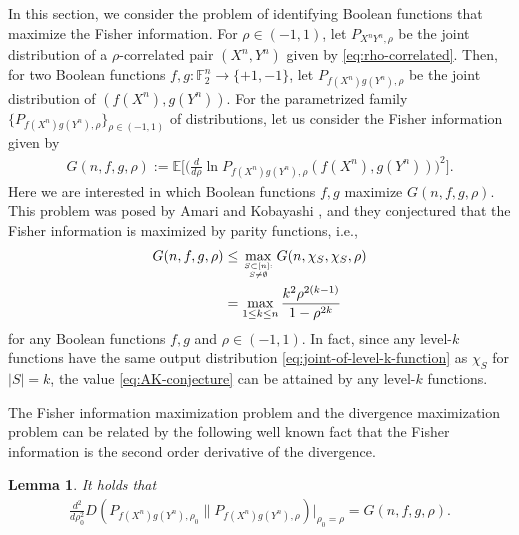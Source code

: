 \documentclass[journal,draftcls, onecolumn]{IEEEtran}
\newtheorem{lemma}{Lemma}
\begin{document}
In this section, we consider the problem of identifying Boolean functions that maximize the Fisher information.
For $\rho \in (-1,1)$, let $P_{X^nY^n,\rho}$ be the joint distribution of a $\rho$-correlated pair
$(X^n,Y^n)$ given by \eqref{eq:rho-correlated}. Then, for two Boolean functions
$f,g:\mathbb{F}_2^n \to \{+1,-1\}$, let $P_{f(X^n)g(Y^n),\rho}$ be the joint distribution of 
$(f(X^n),g(Y^n))$. For the parametrized family $\{ P_{f(X^n)g(Y^n),\rho} \}_{\rho \in (-1,1)}$ of distributions, 
let us consider the Fisher information given by
\begin{align*}
G(n,f,g,\rho) := \mathbb{E}\bigg[ \bigg( \frac{d}{d\rho} \ln P_{f(X^n)g(Y^n),\rho}(f(X^n),g(Y^n)) \bigg)^2 \bigg].
\end{align*}
Here we are interested in which Boolean functions $f,g$ maximize $G(n,f,g,\rho)$.
This problem was posed by Amari and Kobayashi \cite{Amari:23,Amari-biograph,KobAma:23}, and they conjectured that the Fisher information
is maximized by parity functions, i.e.,
\begin{align}
G(n,f,g,\rho) &\le \max_{S \subset [n]: \atop S \neq \emptyset} G(n, \chi_S,\chi_S,\rho) \\
&= \max_{1\le k \le n} \frac{k^2 \rho^{2(k-1)}}{1-\rho^{2k}} \label{eq:AK-conjecture}
\end{align}
for any Boolean functions $f,g$ and $\rho \in (-1,1)$.
In fact, since any level-$k$ functions have the same output distribution \eqref{eq:joint-of-level-k-function} as $\chi_S$ for $|S|=k$,
the value \eqref{eq:AK-conjecture} can be attained by any level-$k$ functions.

The Fisher information maximization problem and the divergence maximization problem can be
related by the following well known fact that the Fisher information is the second order derivative of the divergence.
\begin{lemma}
It holds that
\begin{align}
\frac{d^2}{d\rho_0^2} D(P_{f(X^n)g(Y^n),\rho_0} \| P_{f(X^n)g(Y^n),\rho})\bigg|_{\rho_0=\rho} = G(n,f,g,\rho).
\end{align}
\end{lemma}
\end{document}
